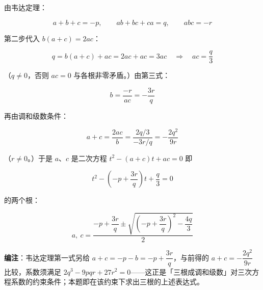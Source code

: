 \begin{answer}
由韦达定理：

\nopagebreak[4]
\[
a+b+c=-p,\qquad ab+bc+ca=q,\qquad abc=-r
\]

第二步代入 $b(a+c)=2ac$：

\nopagebreak[4]
\[
q=b(a+c)+ac=2ac+ac=3ac\quad\Longrightarrow\quad ac=\frac q3
\]

（$q\neq0$，否则 $ac=0$ 与各根非零矛盾。）由第三式：

\nopagebreak[4]
\[
b=\frac{-r}{ac}=-\frac{3r}{q}
\]

再由调和级数条件：

\nopagebreak[4]
\[
a+c=\frac{2ac}{b}=\frac{2q/3}{-3r/q}=-\frac{2q^2}{9r}
\]

（$r\neq0$。）于是 $a$、$c$ 是二次方程 $t^2-(a+c)t+ac=0$ 即

\nopagebreak[4]
\[
t^2-\left(-p+\frac{3r}{q}\right)t+\frac q3=0
\]

的两个根：

\nopagebreak[4]
\[
a,\ c=\frac{-p+\dfrac{3r}{q}\pm\sqrt{\left(-p+\dfrac{3r}{q}\right)^2-\dfrac{4q}{3}}}{2}
\]

\begin{gktip}
\textbf{编注}：韦达定理第一式另给 $a+c=-p-b=-p+\dfrac{3r}{q}$，与前得的 $a+c=-\dfrac{2q^2}{9r}$ 比较，系数须满足 $2q^3-9pqr+27r^2=0$——这正是「三根成调和级数」对三次方程系数的约束条件；本题即在该约束下求出三根的上述表达式。
\end{gktip}


\end{answer}